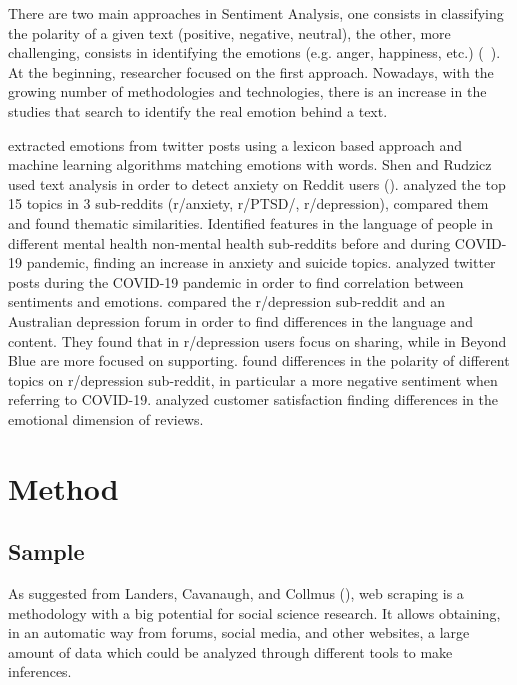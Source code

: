 \documentclass{article}
\begin{document}
There are two main approaches in Sentiment Analysis, one consists in classifying the polarity of a given text (positive, negative, neutral), the other, more challenging, consists in identifying the emotions (e.g. anger, happiness, etc.) (~\cite{kennedy2021text}). At the beginning, researcher focused on the first approach. Nowadays, with the growing number of methodologies and technologies, there is an increase in the studies that search to identify the real emotion behind a text.




\cite{gaikwad2016multiclass} extracted emotions from twitter posts using a lexicon based approach and machine learning algorithms matching emotions with words.
Shen and Rudzicz used text analysis in order to detect anxiety on Reddit users (\citeyear{shen2017detecting}).
\cite{park2018examining} analyzed the top 15 topics in 3 sub-reddits (r/anxiety, r/PTSD/, r/depression), compared them and found thematic similarities.
\cite{low2020natural} Identified features in the language of people in different mental health non-mental health sub-reddits before and during COVID-19 pandemic, finding an increase in anxiety and suicide topics.
\cite{imran2020cross} analyzed twitter posts during the COVID-19 pandemic in order to find correlation between sentiments and emotions.
\cite{mossburger2020exploring} compared the r/depression sub-reddit and an Australian depression forum in order to find differences in the language and content. They found that in r/depression users focus on sharing, while in Beyond Blue are more focused on supporting.
\cite{chen2021sentiment} found differences in the polarity of different topics on r/depression sub-reddit, in particular a more negative sentiment when referring to COVID-19.
\cite{pasca2022text} analyzed customer satisfaction finding differences in the emotional dimension of reviews.


\section{Method}



\subsection{Sample}

As suggested from Landers, Cavanaugh, and Collmus (\citeyear{landers2016primer}), web scraping is a methodology with a big potential for social science research. It allows obtaining, in an automatic way from forums, social media, and other websites, a large amount of data which could be analyzed through different tools to make inferences. 
\end{document}
